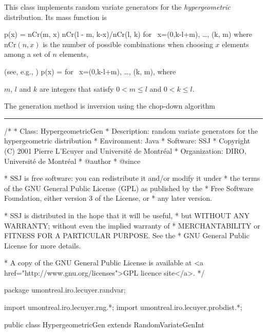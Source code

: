 
This class implements random variate generators for the 
{\em hypergeometric\/} distribution. Its mass function is
\begin{htmlonly}
\eq
    p(x) = 
            \mbox{nCr}(m, x) \mbox{nCr}(l - m, k-x)/\mbox{nCr}(l, k)
            \qquad \mbox {for }
            x=\max(0,k-l+m), \dots, \min(k, m)
\endeq
where nCr$(n,x)$ is the number of possible combinations when choosing
$x$ elements among a set of $n$ elements,
\end{htmlonly}
\begin{latexonly}
(see, e.g., \cite[page 101]{rGEN98a}) 
\eq
    p(x) = 
            \qquad \mbox {for }
            x=\max(0,k-l+m), \dots, \min(k, m),    
\endeq
where
\end{latexonly}
$m$, $l$ and $k$ are integers that satisfy $0< m\le l$ and $0 < k\le l$.

The generation method is inversion using the chop-down algorithm \cite{sKAC85a}

\bigskip\hrule


\begin{code}
\begin{hide}
/*
 * Class:        HypergeometricGen
 * Description:  random variate generators for the hypergeometric distribution
 * Environment:  Java
 * Software:     SSJ 
 * Copyright (C) 2001  Pierre L'Ecuyer and Université de Montréal
 * Organization: DIRO, Université de Montréal
 * @author       
 * @since

 * SSJ is free software: you can redistribute it and/or modify it under
 * the terms of the GNU General Public License (GPL) as published by the
 * Free Software Foundation, either version 3 of the License, or
 * any later version.

 * SSJ is distributed in the hope that it will be useful,
 * but WITHOUT ANY WARRANTY; without even the implied warranty of
 * MERCHANTABILITY or FITNESS FOR A PARTICULAR PURPOSE.  See the
 * GNU General Public License for more details.

 * A copy of the GNU General Public License is available at
   <a href="http://www.gnu.org/licenses">GPL licence site</a>.
 */
\end{hide}
package umontreal.iro.lecuyer.randvar;\begin{hide}
import umontreal.iro.lecuyer.rng.*;
import umontreal.iro.lecuyer.probdist.*;
\end{hide}

public class HypergeometricGen extends RandomVariateGenInt \begin{hide} {
   private int m;
   private int l;
   private int k;    
\end{hide}
\end{code}

